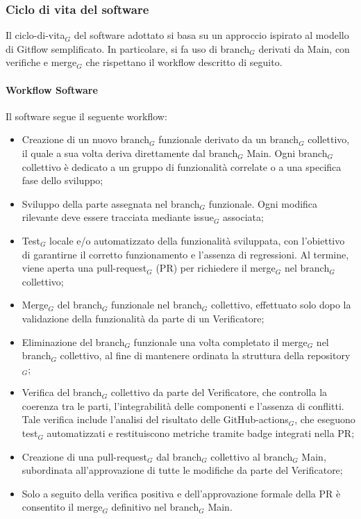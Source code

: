 \documentclass[10pt]{article}
\begin{document}
\begin{justify}
    \subsubsection{Ciclo di vita del software}
    Il ciclo-di-vita$_G$ del software adottato si basa su un approccio ispirato al modello di Gitflow semplificato.
    In particolare, si fa uso di branch$_G$ derivati da Main, con verifiche e merge$_G$ che rispettano il workflow descritto di seguito.

    \paragraph{Workflow Software}
    Il software segue il seguente workflow:
    \begin{itemize}
        \item Creazione di un nuovo branch$_G$ funzionale derivato da un branch$_G$ collettivo, il quale a sua volta deriva direttamente dal branch$_G$ Main. Ogni branch$_G$ collettivo è dedicato a un gruppo di funzionalità correlate o a una specifica fase dello sviluppo;
        \item Sviluppo della parte assegnata nel branch$_G$ funzionale. Ogni modifica rilevante deve essere tracciata mediante issue$_G$ associata;
        \item Test$_G$ locale e/o automatizzato della funzionalità sviluppata, con l'obiettivo di garantirne il corretto funzionamento e l'assenza di regressioni. Al termine, viene aperta una pull-request$_G$ (PR) per richiedere il merge$_G$ nel branch$_G$ collettivo;
        \item Merge$_G$ del branch$_G$ funzionale nel branch$_G$ collettivo, effettuato solo dopo la validazione della funzionalità da parte di un Verificatore;
        \item Eliminazione del branch$_G$ funzionale una volta completato il merge$_G$ nel branch$_G$ collettivo, al fine di mantenere ordinata la struttura della repository$_G$;
        \item Verifica del branch$_G$ collettivo da parte del Verificatore, che controlla la coerenza tra le parti, l'integrabilità delle componenti e l'assenza di conflitti. Tale verifica include l'analisi del risultato delle GitHub-actions$_G$, che eseguono test$_G$ automatizzati e restituiscono metriche tramite badge integrati nella PR;
        \item Creazione di una pull-request$_G$ dal branch$_G$ collettivo al branch$_G$ Main, subordinata all’approvazione di tutte le modifiche da parte del Verificatore;
        \item Solo a seguito della verifica positiva e dell'approvazione formale della PR è consentito il merge$_G$ definitivo nel branch$_G$ Main.
    \end{itemize}


\end{justify}
\end{document}
